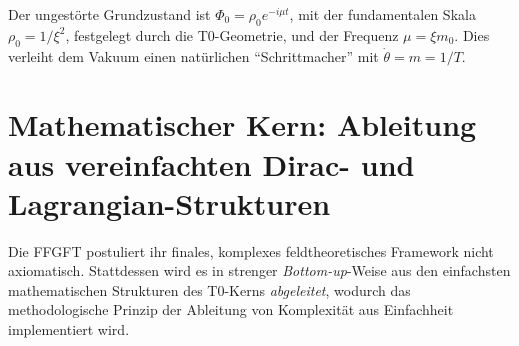 	Der ungestörte Grundzustand ist $\Phi_0 = \rho_0 e^{-i\mu t}$, mit der fundamentalen Skala $\rho_0 = 1/\xi^2$, festgelegt durch die T0-Geometrie, und der Frequenz $\mu = \xi m_0$. Dies verleiht dem Vakuum einen natürlichen ``Schrittmacher'' mit $\dot{\theta} = m = 1/T$.
	
	\section{Mathematischer Kern: Ableitung aus vereinfachten Dirac- und Lagrangian-Strukturen}
	
	Die FFGFT postuliert ihr finales, komplexes feldtheoretisches Framework nicht axiomatisch. Stattdessen wird es in strenger \emph{Bottom-up}-Weise aus den einfachsten mathematischen Strukturen des T0-Kerns \emph{abgeleitet}, wodurch das methodologische Prinzip der Ableitung von Komplexität aus Einfachheit implementiert wird.
	
